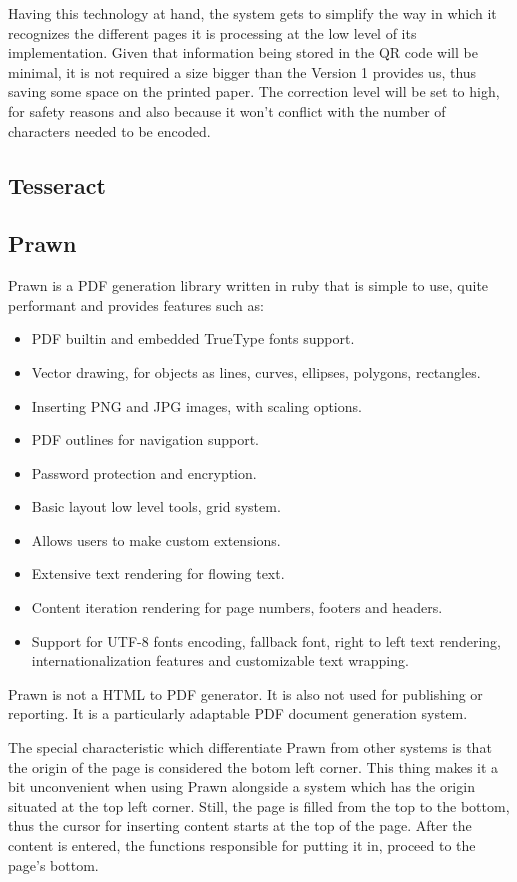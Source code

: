 Having this technology at hand, the system gets to simplify the way in which it recognizes the different pages it is processing at the low level of its implementation. Given that information being stored in the QR code will be minimal, it is not required a size bigger than the Version 1 provides us, thus saving some space on the printed paper. The correction level will be set to high, for safety reasons and also because it won’t conflict with the number of characters needed to be encoded.

\newpage
\subsection{Tesseract}


\subsection{Prawn}
Prawn is a PDF generation library written in ruby that is simple to use, quite performant and provides features such as:

\begin{itemize} 
  \item PDF builtin and embedded TrueType fonts support.
  \item Vector drawing, for objects as lines, curves, ellipses, polygons, rectangles.
  \item Inserting PNG and JPG images, with scaling options.
  \item PDF outlines for navigation support.
  \item Password protection and encryption.
  \item Basic layout low level tools, grid system.
  \item Allows users to make custom extensions.
  \item Extensive text rendering for flowing text.
  \item Content iteration rendering for page numbers, footers and headers.
  \item Support for UTF-8 fonts encoding, fallback font, right to left text rendering, internationalization features and customizable text wrapping.
\end{itemize}

Prawn is not a HTML to PDF generator. It is also not used for publishing or reporting. It is a particularly adaptable PDF document generation system. 

The special characteristic which differentiate Prawn from other systems is that the origin of the page is considered the botom left corner. This thing makes it a bit unconvenient when using Prawn alongside a system which has the origin situated at the top left corner. Still, the page is filled from the top to the bottom, thus the cursor for inserting content starts at the top of the page. After the content is entered, the functions responsible for putting it in, proceed to the page's bottom.

